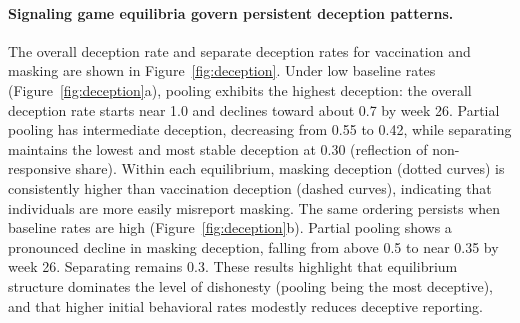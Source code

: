 \documentclass[sigconf,review]{acmart}
\begin{document}

\paragraph{Signaling game equilibria govern persistent deception patterns.}
 The overall deception rate and separate deception rates for vaccination and masking are shown in Figure~\ref{fig:deception}. Under low baseline rates (Figure~\ref{fig:deception}a), pooling exhibits the highest deception: the overall deception rate starts near 1.0 and declines toward about 0.7 by week 26. Partial pooling has intermediate deception, decreasing from 0.55 to 0.42, while separating maintains the lowest and most stable deception at 0.30 (reflection of non-responsive share). Within each equilibrium, masking deception (dotted curves) is consistently higher than vaccination deception (dashed curves), indicating that individuals are more easily misreport masking.
The same ordering persists when baseline rates are high (Figure~\ref{fig:deception}b). Partial pooling shows a pronounced decline in masking deception, falling from above 0.5 to near 0.35 by week 26. Separating remains 0.3. 
These results highlight that equilibrium structure dominates the level of dishonesty (pooling being the most deceptive), and that higher initial behavioral rates modestly reduces deceptive reporting.
\end{document}
